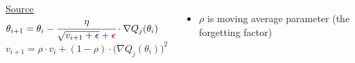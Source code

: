 \documentclass[12pt, aspectratio = 169]{beamer}
\newcommand{\red}{\color{calmRed}}
\newcommand{\blue}{\color{calmBlue}}
\newcommand{\black}{\color{black}}
\begin{document}
\begin{frame}
\begin{columns}[T]
\begin{minipage}[t]{\linewidth}
		    \href{https://deepai.org/machine-learning-glossary-and-terms/rmsprop}{\color{blue}\uline{Source}}\\
    	    $\theta_{i+1} = \theta_i - \cfrac{\eta}{\sqrt{v_{i+1} + \blue \bm \epsilon \black} + \red \bm \epsilon \black} \cdot \nabla Q_j(\theta_i)$\\
		    $v_{i+1} = \rho \cdot v_i + (1 - \rho) \cdot \big(\nabla Q_j(\theta_i) \big)^2$\\
		    \begin{itemize}
		        \item $\rho$ is moving average parameter (the forgetting factor)
		    \end{itemize}
        \end{minipage}
    \end{columns}
\end{frame}

\end{document}
